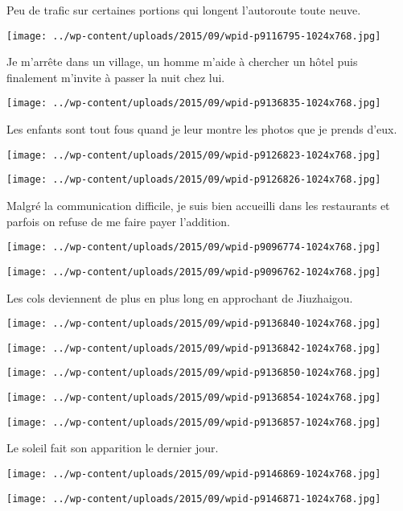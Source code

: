 \pagebreak
 Peu de trafic sur certaines portions qui longent l'autoroute toute neuve.
\begin{center} \texttt{[image: ../wp-content/uploads/2015/09/wpid-p9116795-1024x768.jpg]} \end{center}

 Je m'arrête dans un village, un homme m'aide à chercher un hôtel puis finalement m'invite à passer la nuit chez lui.
\begin{center} \texttt{[image: ../wp-content/uploads/2015/09/wpid-p9136835-1024x768.jpg]} \end{center}

\pagebreak
 Les enfants sont tout fous quand je leur montre les photos que je prends d'eux.
\begin{center} \texttt{[image: ../wp-content/uploads/2015/09/wpid-p9126823-1024x768.jpg]} \end{center}
\begin{center} \texttt{[image: ../wp-content/uploads/2015/09/wpid-p9126826-1024x768.jpg]} \end{center}

\pagebreak
 Malgré la communication difficile, je suis bien accueilli dans les restaurants et parfois on refuse de me faire payer l'addition. 
\begin{center} \texttt{[image: ../wp-content/uploads/2015/09/wpid-p9096774-1024x768.jpg]} \end{center}
\begin{center} \texttt{[image: ../wp-content/uploads/2015/09/wpid-p9096762-1024x768.jpg]} \end{center}

\pagebreak
  Les cols deviennent de plus en plus long en approchant de Jiuzhaigou. 
\begin{center} \texttt{[image: ../wp-content/uploads/2015/09/wpid-p9136840-1024x768.jpg]} \end{center}
\begin{center} \texttt{[image: ../wp-content/uploads/2015/09/wpid-p9136842-1024x768.jpg]} \end{center}
\begin{center} \texttt{[image: ../wp-content/uploads/2015/09/wpid-p9136850-1024x768.jpg]} \end{center}
\begin{center} \texttt{[image: ../wp-content/uploads/2015/09/wpid-p9136854-1024x768.jpg]} \end{center}
\begin{center} \texttt{[image: ../wp-content/uploads/2015/09/wpid-p9136857-1024x768.jpg]} \end{center}

 Le soleil fait son apparition le dernier jour. 
\begin{center} \texttt{[image: ../wp-content/uploads/2015/09/wpid-p9146869-1024x768.jpg]} \end{center}
\begin{center} \texttt{[image: ../wp-content/uploads/2015/09/wpid-p9146871-1024x768.jpg]} \end{center}